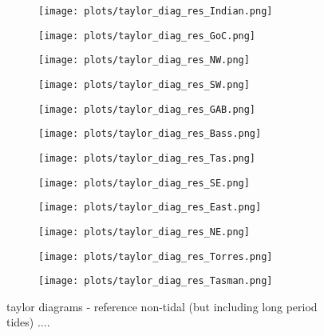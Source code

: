 \begin{figure}[H]
\centering
    \begin{subfigure}[a]{0.29\textwidth}
        \texttt{[image: plots/taylor\_diag\_res\_Indian.png]}
    \end{subfigure}
    \begin{subfigure}[a]{0.29\textwidth}
        \texttt{[image: plots/taylor\_diag\_res\_GoC.png]}
    \end{subfigure}
    \begin{subfigure}[a]{0.29\textwidth}
        \texttt{[image: plots/taylor\_diag\_res\_NW.png]}
    \end{subfigure}
    \begin{subfigure}[a]{0.29\textwidth}
        \texttt{[image: plots/taylor\_diag\_res\_SW.png]}
    \end{subfigure}
    \begin{subfigure}[a]{0.29\textwidth}
        \texttt{[image: plots/taylor\_diag\_res\_GAB.png]}
    \end{subfigure}
    \begin{subfigure}[a]{0.29\textwidth}
        \texttt{[image: plots/taylor\_diag\_res\_Bass.png]}
    \end{subfigure}
    \begin{subfigure}[a]{0.29\textwidth}
        \texttt{[image: plots/taylor\_diag\_res\_Tas.png]}
    \end{subfigure}
    \begin{subfigure}[a]{0.29\textwidth}
        \texttt{[image: plots/taylor\_diag\_res\_SE.png]}
    \end{subfigure}
    \begin{subfigure}[a]{0.29\textwidth}
        \texttt{[image: plots/taylor\_diag\_res\_East.png]}
    \end{subfigure}
    \begin{subfigure}[a]{0.29\textwidth}
        \texttt{[image: plots/taylor\_diag\_res\_NE.png]}
    \end{subfigure}
    \begin{subfigure}[a]{0.29\textwidth}
        \texttt{[image: plots/taylor\_diag\_res\_Torres.png]}
    \end{subfigure}
    \begin{subfigure}[a]{0.29\textwidth}
        \texttt{[image: plots/taylor\_diag\_res\_Tasman.png]}
    \end{subfigure}
    \caption{ taylor diagrams - reference non-tidal (but including long period tides) ....}
\end{figure}   



